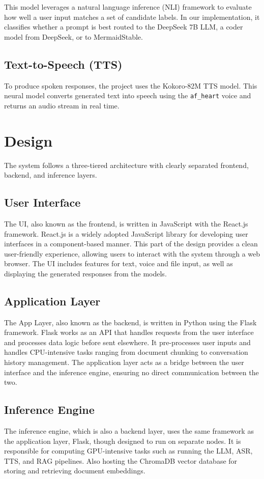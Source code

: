 \documentclass[twocolumn]{article}
\begin{document}
This model leverages a natural language inference (NLI) framework to evaluate how well a user input matches a set of candidate labels. In our implementation, it classifies whether a prompt is best routed to the DeepSeek 7B LLM, a coder model from DeepSeek, or to MermaidStable. 

\subsection{Text-to-Speech (TTS)}
To produce spoken responses, the project uses the Kokoro-82M TTS model\cite{kokoro82m}. This neural model converts generated text into speech using the \texttt{af\_heart} voice and returns an audio stream in real time.

\section{Design}
The system follows a three-tiered architecture with clearly separated frontend, backend, and inference layers.

\subsection{User Interface}
The UI, also known as the frontend, is written in JavaScript with the React.js\cite{reactjs} framework. React.js is a widely adopted JavaScript library for developing user interfaces in a component-based manner. This part of the design provides a clean user-friendly experience, allowing users to interact with the system through a web browser. The UI includes features for text, voice and file input, as well as displaying the generated responses from the models.

\subsection{Application Layer}
The App Layer, also known as the backend, is written in Python using the Flask framework\cite{flaskdocs}. Flask works as an API that handles requests from the user interface and processes data logic before sent elsewhere. It pre-processes user inputs and handles CPU-intensive tasks ranging from document chunking to conversation history management. The application layer acts as a bridge between the user interface and the inference engine, ensuring no direct communication between the two.

\subsection{Inference Engine}
The inference engine, which is also a backend layer, uses the same framework as the application layer, Flask, though designed to run on separate nodes.
It is responsible for computing GPU-intensive tasks such as running the LLM, ASR, TTS, and RAG pipelines. Also hosting the ChromaDB\cite{chromadb2023} vector
database for storing and retrieving document embeddings.
\end{document}
